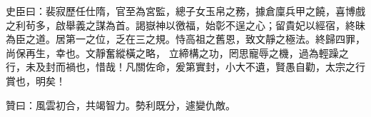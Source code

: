 \begin{pinyinscope}
 史臣曰：裴寂歷任仕隋，官至為宮監，總子女玉帛之務，據倉廩兵甲之饒，喜博戲之利茍多，啟舉義之謀為首。謁嶽神以徼福，始彰不逞之心；留貴妃以經宿，終昧為臣之道。居第一之位，乏在三之規。恃高祖之舊恩，致文靜之極法。終歸四罪，尚保再生，幸也。文靜奮縱橫之略，
 立締構之功，罔思寵辱之機，過為輕躁之行，未及封而禍也，惜哉！凡關佐命，爰第實封，小大不遺，賢愚自勸，太宗之行賞也，明矣！



 贊曰：風雲初合，共竭智力。勢利既分，遽變仇敵。



\end{pinyinscope}